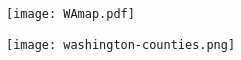 \documentclass[10pt]{article}
\begin{document}
\begin{landscape}

\end{landscape}

\begin{landscape}
\begin{figure} 
  \begin{center}
    \texttt{[image: WAmap.pdf]}
  \end{center}
\end{figure}
\end{landscape}

\begin{landscape}
\begin{figure} 
  \begin{center}
    \texttt{[image: washington-counties.png]}
  \end{center}
\end{figure}
\end{landscape}

\begin{landscape}

\end{landscape}
\end{document}
